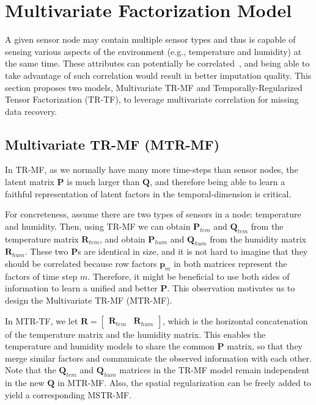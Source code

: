 
\section{Multivariate Factorization Model} \label{sec:tf}
A given sensor node may contain multiple sensor types and thus is capable of sensing various aspects of the environment (e.g., temperature and humidity) at the same time.
These attributes can potentially be correlated~\cite{deshpande2005}, and being able to take advantage of such correlation would result in better imputation quality.
This section proposes two models, Multivariate TR-MF and Temporally-Regularized Tensor Factorization (TR-TF), to leverage multivariate correlation for missing data recovery.

\subsection{Multivariate TR-MF (MTR-MF)}

In TR-MF, as we normally have many more time-steps than sensor nodes, the latent matrix $\mathbf{P}$ is much larger than $\mathbf{Q}$, and therefore being able to learn a faithful representation of latent factors in the temporal-dimen\-sion is critical. 

For concreteness, assume there are two types of sensors in a node: temperature and humidity.
Then, using TR-MF we can obtain $\mathbf{P}_{tem}$ and $\mathbf{Q}_{tem}$ from the temperature 
matrix $\mathbf{R}_{tem}$, and obtain $\mathbf{P}_{hum}$ and $\mathbf{Q}_{hum}$ from the
humidity matrix $\mathbf{R}_{hum}$.
These two $\mathbf{P}$s are identical in size, and it is not hard to imagine that they should be correlated because row factors $\mathbf{p}_m$ in both matrices represent the factors of time step $m$.
Therefore, it might be beneficial to use both sides of information to learn a unified and better $\mathbf{P}$.
This observation motivates us to design the Multivariate TR-MF (MTR-MF).

In MTR-TF, we let 
$\mathbf{R} = \begin{bmatrix}\mathbf{R}_{tem} & \mathbf{R}_{hum} \end{bmatrix}$,
which is the horizontal concatenation of the temperature matrix and the humidity matrix.
This enables the temperature and humidity models to share the common $\mathbf{P}$ matrix, 
so that they merge similar factors and communicate the observed information with each other.
Note that the $\mathbf{Q}_{tem}$ and $\mathbf{Q}_{hum}$ matrices in the TR-MF model remain independent in the new $\mathbf{Q}$ in MTR-MF.
Also, the spatial regularization can be freely added to yield a corresponding MSTR-MF.

